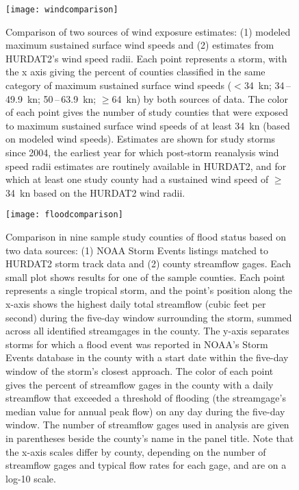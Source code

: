 \begin{figure}[tbhp!]
\centering
\texttt{[image: windcomparison]}
	\caption{Comparison of two sources of wind exposure estimates: 
	(1) modeled maximum sustained surface wind speeds 
	and (2) estimates from \ac{HURDAT2}'s wind speed radii.
	Each point represents a storm, with the x axis giving the percent of
	counties classified in the same category of maximum sustained surface
	wind speeds ($<$34~\si{\knot}; 34\,--\,49.9~\si{\knot};
	50\,--\,63.9~\si{\knot}; $\ge$64~\si{\knot}) by both sources of 
	data. The color of each point gives the number of study counties that were exposed to
	maximum sustained surface wind speeds of at least 34~\si{\knot} (based
	on modeled wind speeds). Estimates are shown for study storms since
	2004, the earliest year for which post-storm reanalysis wind speed
	radii estimates are routinely available in \ac{HURDAT2}, and for which at
	least one study county had a sustained wind speed of $\ge$34~\si{\knot}
	based on the \ac{HURDAT2} wind radii.
	}
\label{fig:windcomparison}
\end{figure}

\begin{figure}[tbhp!]
\centering
\texttt{[image: floodcomparison]}
\caption{Comparison in nine sample study counties of flood status based on
	two data sources: (1) NOAA Storm Events listings matched to \ac{HURDAT2} storm track data
	and (2) county streamflow gages. Each small plot shows results for one of the sample
	counties. Each point represents a single tropical storm, and the
	point's position along the x-axis shows the highest daily total
	streamflow (cubic feet per second) during the five-day window surrounding the storm, 
	summed across all identified
	streamgages in the county. The y-axis separates storms
	for which a flood event was reported in NOAA's Storm Events database
	in the county with a start date within the five-day window of the
	storm's closest approach. The color of each point gives
	the percent of streamflow gages in the county with a daily streamflow
	that exceeded a threshold of flooding (the streamgage's median value
	for annual peak flow) on any day during the five-day window. The number
	of streamflow gages used in analysis are given in parentheses beside
	the county's name in the panel title.  Note that the x-axis scales
	differ by county, depending on the number of streamflow gages and
	typical flow rates for each gage, and are on a log-10 scale.
	}
\label{fig:floodcomparison}
\end{figure}

